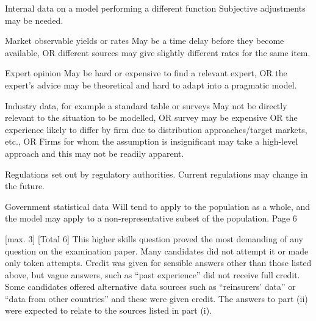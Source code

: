 \documentclass[a4paper,12pt]{article}
\begin{document}
Internal data on a model performing a different function
Subjective adjustments may be needed.

Market observable yields or rates
May be a time delay before they become available,
OR
different sources may give slightly different rates for the same item.

Expert opinion
May be hard or expensive to find a relevant expert,
OR
the expert’s advice may be theoretical and hard to adapt
into a pragmatic model.

Industry data, for example a standard table or surveys
May not be directly relevant to the situation to be modelled,
OR
survey may be expensive
OR
the experience likely to differ by firm due to distribution
approaches/target markets, etc.,
OR
Firms for whom the assumption is insignificant may take a high-level
approach and this may not be readily apparent.

Regulations set out by regulatory authorities.
Current regulations may change in the future.

Government statistical data
Will tend to apply to the population as a whole, and the
model may apply to a non-representative subset of the population.
Page 6

[max. 3]
[Total 6]
This higher skills question proved the most demanding of any
question on the examination paper. Many candidates did not
attempt it or made only token attempts. Credit was given for
sensible answers other than those listed above, but vague answers,
such as “past experience” did not receive full credit. Some
candidates offered alternative data sources such as “reinsurers’
data” or “data from other countries” and these were given credit.
The answers to part (ii) were expected to relate to the sources
listed in part (i).
\end{document}
